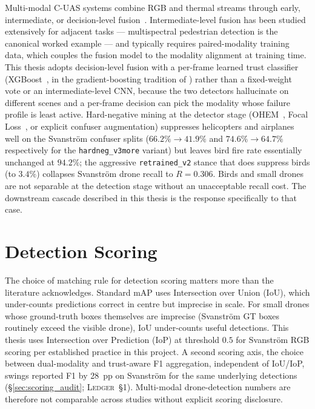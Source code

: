 \documentclass[12pt,a4paper,oneside,openright]{book}
\begin{document}
Multi-modal C-UAS systems combine RGB and thermal streams through early, intermediate, or decision-level fusion~\cite{ramachandram2017fusion}. Intermediate-level fusion has been studied extensively for adjacent tasks --- multispectral pedestrian detection \cite{wagner2016multispectral} is the canonical worked example --- and typically requires paired-modality training data, which couples the fusion model to the modality alignment at training time. This thesis adopts decision-level fusion with a per-frame learned trust classifier (XGBoost~\cite{chen2016xgboost}, in the gradient-boosting tradition of \citet{friedman2001greedy}) rather than a fixed-weight vote or an intermediate-level CNN, because the two detectors hallucinate on different scenes and a per-frame decision can pick the modality whose failure profile is least active. Hard-negative mining at the detector stage (OHEM~\cite{shrivastava2016ohem}, Focal Loss~\cite{lin2017focal}, or explicit confuser augmentation) suppresses helicopters and airplanes well on the Svanstr\"om confuser splits ($66.2\% \to 41.9\%$ and $74.6\% \to 64.7\%$ respectively for the \texttt{hardneg\_v3more} variant) but leaves bird fire rate essentially unchanged at $94.2\%$; the aggressive \texttt{retrained\_v2} stance that does suppress birds (to $3.4\%$) collapses Svanstr\"om drone recall to $R=0.306$. Birds and small drones are not separable at the detection stage without an unacceptable recall cost. The downstream cascade described in this thesis is the response specifically to that case.

\section{Detection Scoring}
\label{sec:lit_calibration}

The choice of matching rule for detection scoring matters more than the literature acknowledges. Standard mAP uses Intersection over Union (IoU), which under-counts predictions correct in centre but imprecise in scale. For small drones whose ground-truth boxes themselves are imprecise (Svanstr\"om GT boxes routinely exceed the visible drone), IoU under-counts useful detections. This thesis uses Intersection over Prediction (IoP) at threshold $0.5$ for Svanstr\"om RGB scoring per established practice in this project. A second scoring axis, the choice between dual-modality and trust-aware F1 aggregation, independent of IoU/IoP, swings reported F1 by 28~pp on Svanstr\"om for the same underlying detections (\S\ref{sec:scoring_audit}; \textsc{Ledger}~\S1). Multi-modal drone-detection numbers are therefore not comparable across studies without explicit scoring disclosure.
\end{document}
